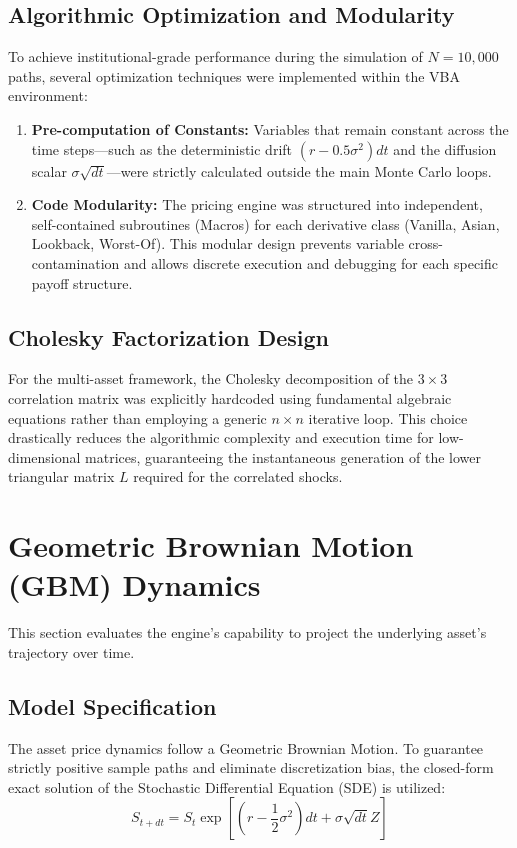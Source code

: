 \documentclass{report}
\begin{document}
\subsection{Algorithmic Optimization and Modularity}
To achieve institutional-grade performance during the simulation of $N=10{,}000$ paths, several optimization techniques were implemented within the VBA environment:
\begin{enumerate}
    \item \textbf{Pre-computation of Constants:} Variables that remain constant across the time steps—such as the deterministic drift $(r - 0.5\sigma^2)dt$ and the diffusion scalar $\sigma\sqrt{dt}$—were strictly calculated outside the main Monte Carlo loops.
    \item \textbf{Code Modularity:} The pricing engine was structured into independent, self-contained subroutines (Macros) for each derivative class (Vanilla, Asian, Lookback, Worst-Of). This modular design prevents variable cross-contamination and allows discrete execution and debugging for each specific payoff structure.
\end{enumerate}

\subsection{Cholesky Factorization Design}
For the multi-asset framework, the Cholesky decomposition of the $3 \times 3$ correlation matrix was explicitly hardcoded using fundamental algebraic equations rather than employing a generic $n \times n$ iterative loop. This choice drastically reduces the algorithmic complexity and execution time for low-dimensional matrices, guaranteeing the instantaneous generation of the lower triangular matrix $L$ required for the correlated shocks.


\section{Geometric Brownian Motion (GBM) Dynamics}
This section evaluates the engine's capability to project the underlying asset's trajectory over time.

\subsection{Model Specification}
The asset price dynamics follow a Geometric Brownian Motion. To guarantee strictly positive sample paths and eliminate discretization bias, the closed-form exact solution of the Stochastic Differential Equation (SDE) is utilized:
\begin{equation}
    S_{t+dt} = S_t \exp\left[\left(r - \frac{1}{2}\sigma^2\right)dt + \sigma \sqrt{dt} Z\right]
\end{equation}
\end{document}
